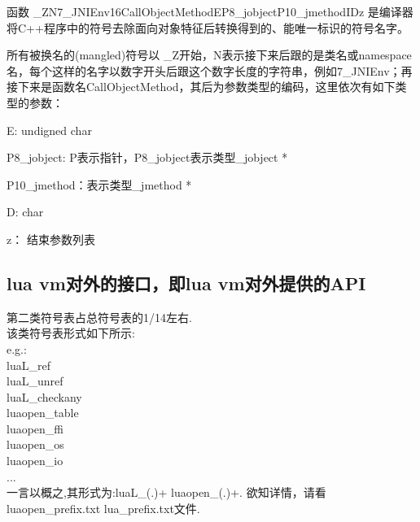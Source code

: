 函数 \_ZN7\_JNIEnv16CallObjectMethodEP8\_jobjectP10\_jmethodIDz 是编译器将C++程序中的符号去除面向对象特征后转换得到的、能唯一标识的符号名字。

所有被换名的(mangled)符号以 \_Z开始，N表示接下来后跟的是类名或namespace名，每个这样的名字以数字开头后跟这个数字长度的字符串，例如7\_JNIEnv；再接下来是函数名CallObjectMethod，其后为参数类型的编码，这里依次有如下类型的参数：

E: undigned char

P8\_jobject: P表示指针，P8\_jobject表示类型\_jobject *

P10\_jmethod：表示类型\_jmethod *

D: char

z： 结束参数列表

\subsection{lua vm对外的接口，即lua vm对外提供的API}
\label{sec:so:lualib}
第二类符号表占总符号表的1/14左右.\\
该类符号表形式如下所示:\\
e.g.:\\
	luaL\_ref\\
	luaL\_unref\\
	luaL\_checkany\\
	luaopen\_table\\
	luaopen\_ffi\\
	luaopen\_os\\
	luaopen\_io\\
	...\\
一言以概之,其形式为:luaL\_(.)+ luaopen\_(.)+.
欲知详情，请看luaopen\_prefix.txt  lua\_prefix.txt文件.


